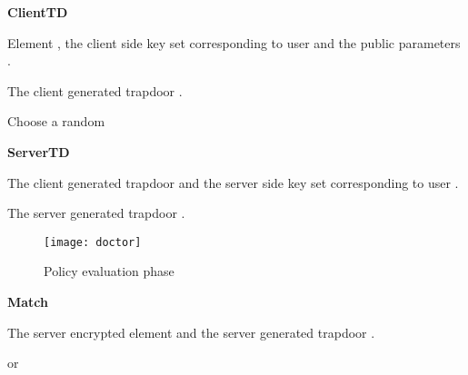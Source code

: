 \documentclass[final,5p,times,twocolumn]{elsarticle}
\newcommand{\algofontsize}{\fontsize{7}{8}\selectfont}
\begin{document}
\begin{algorithm}[h]
{\algofontsize
\caption{\textbf{ClientTD}}

\label{algo:client-td}

\begin{algorithmic}[1]

\REQUIRE Element , the client side key set  corresponding to user  and the public parameters .

\ENSURE The client generated trapdoor .

\medskip

\STATE Choose a random  \label{line:c-td-choose}
\STATE  \label{line:c-td-sigma}
\STATE  \label{line:c-td-t1}
\STATE  \label{line:c-td-t2}

\STATE  \label{line:c-td-td}

\RETURN 

\end{algorithmic}
}
\end{algorithm}





\begin{algorithm}[htp]
{\algofontsize
\caption{\textbf{ServerTD}}

\label{algo:server-td}

\begin{algorithmic}[1]

\REQUIRE The client generated trapdoor  and the server side key set  corresponding to user .

\ENSURE The server generated trapdoor .

\medskip

\STATE  \label{line:s-td-calculate}

\RETURN 

\end{algorithmic}
}
\end{algorithm}

\begin{figure}
\centering
\texttt{[image: doctor]}
\caption{Policy evaluation phase}
\label{fig:doctor}
\end{figure}




\begin{algorithm}[h]
{\algofontsize
\caption{\textbf{Match}}

\label{algo:match}

\begin{algorithmic}[1]

\REQUIRE The server encrypted element  and the server generated trapdoor .

\ENSURE  or 

\medskip

\IF {} \label{line:match-condition}

	\RETURN  \label{line:match-true}
	
\ELSE

	\RETURN  \label{line:match-false}
	
\ENDIF

\end{algorithmic}
}
\end{algorithm}
\end{document}
